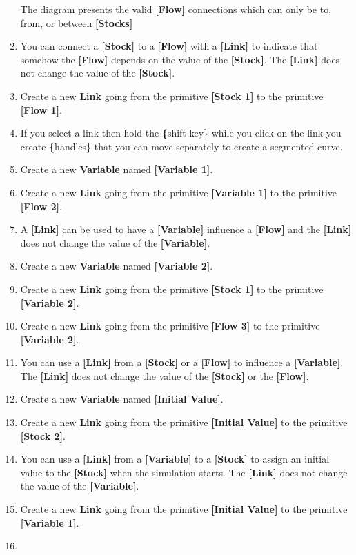 \documentclass[]{memoir}
\newcommand{\p}[1]{\textbf{{[}#1{]}}}
\renewcommand{\u}[1]{\textbf{#1}}
\renewcommand{\a}[1]{\textbf{#1}}
\begin{document}
\begin{oframed}
\begin{enumerate}
The diagram presents the valid \p{Flow} connections which can only be to, from, or between \p{Stocks}


\item 

You can connect a \p{Stock} to a \p{Flow} with a \p{Link} to indicate that somehow the \p{Flow} depends on the value of the \p{Stock}. The \p{Link} does not change the value of the \p{Stock}.


\item Create a new \a{Link} going from the primitive \p{Stock 1} to the primitive \p{Flow 1}.
\item 

If you select a link then hold the \u\{shift key\} while you click on the link you create \u\{handles\} that you can move separately to create a segmented curve.


\item Create a new \a{Variable} named \p{Variable 1}.
\item Create a new \a{Link} going from the primitive \p{Variable 1} to the primitive \p{Flow 2}.
\item 

A \p{Link} can be used to have a \p{Variable} influence a \p{Flow} and the \p{Link} does not change the value of the \p{Variable}.


\item Create a new \a{Variable} named \p{Variable 2}.
\item Create a new \a{Link} going from the primitive \p{Stock 1} to the primitive \p{Variable 2}.
\item Create a new \a{Link} going from the primitive \p{Flow 3} to the primitive \p{Variable 2}.
\item 

You can use a \p{Link} from a \p{Stock} or a \p{Flow} to influence a \p{Variable}. The \p{Link} does not change the value of the \p{Stock} or the \p{Flow}.


\item Create a new \a{Variable} named \p{Initial Value}.
\item Create a new \a{Link} going from the primitive \p{Initial Value} to the primitive \p{Stock 2}.
\item 

You can use a \p{Link} from a \p{Variable} to a \p{Stock} to assign an initial value to the \p{Stock} when the simulation starts. The \p{Link} does not change the value of the \p{Variable}.


\item Create a new \a{Link} going from the primitive \p{Initial Value} to the primitive \p{Variable 1}.
\item 


\end{enumerate}
\end{oframed}
\end{document}
